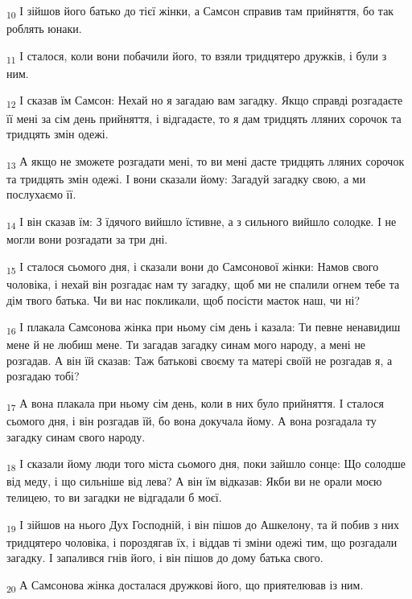 \begin{tcolorbox}
\textsubscript{10} І зійшов його батько до тієї жінки, а Самсон справив там прийняття, бо так роблять юнаки.
\end{tcolorbox}
\begin{tcolorbox}
\textsubscript{11} І сталося, коли вони побачили його, то взяли тридцятеро дружків, і були з ним.
\end{tcolorbox}
\begin{tcolorbox}
\textsubscript{12} І сказав їм Самсон: Нехай но я загадаю вам загадку. Якщо справді розгадаєте її мені за сім день прийняття, і відгадаєте, то я дам тридцять лляних сорочок та тридцять змін одежі.
\end{tcolorbox}
\begin{tcolorbox}
\textsubscript{13} А якщо не зможете розгадати мені, то ви мені дасте тридцять лляних сорочок та тридцять змін одежі. І вони сказали йому: Загадуй загадку свою, а ми послухаємо її.
\end{tcolorbox}
\begin{tcolorbox}
\textsubscript{14} І він сказав їм: З їдячого вийшло їстивне, а з сильного вийшло солодке. І не могли вони розгадати за три дні.
\end{tcolorbox}
\begin{tcolorbox}
\textsubscript{15} І сталося сьомого дня, і сказали вони до Самсонової жінки: Намов свого чоловіка, і нехай він розгадає нам ту загадку, щоб ми не спалили огнем тебе та дім твого батька. Чи ви нас покликали, щоб посісти маєток наш, чи ні?
\end{tcolorbox}
\begin{tcolorbox}
\textsubscript{16} І плакала Самсонова жінка при ньому сім день і казала: Ти певне ненавидиш мене й не любиш мене. Ти загадав загадку синам мого народу, а мені не розгадав. А він їй сказав: Таж батькові своєму та матері своїй не розгадав я, а розгадаю тобі?
\end{tcolorbox}
\begin{tcolorbox}
\textsubscript{17} А вона плакала при ньому сім день, коли в них було прийняття. І сталося сьомого дня, і він розгадав їй, бо вона докучала йому. А вона розгадала ту загадку синам свого народу.
\end{tcolorbox}
\begin{tcolorbox}
\textsubscript{18} І сказали йому люди того міста сьомого дня, поки зайшло сонце: Що солодше від меду, і що сильніше від лева? А він їм відказав: Якби ви не орали моєю телицею, то ви загадки не відгадали б моєї.
\end{tcolorbox}
\begin{tcolorbox}
\textsubscript{19} І зійшов на нього Дух Господній, і він пішов до Ашкелону, та й побив з них тридцятеро чоловіка, і пороздягав їх, і віддав ті зміни одежі тим, що розгадали загадку. І запалився гнів його, і він пішов до дому батька свого.
\end{tcolorbox}
\begin{tcolorbox}
\textsubscript{20} А Самсонова жінка досталася дружкові його, що приятелював із ним.
\end{tcolorbox}
